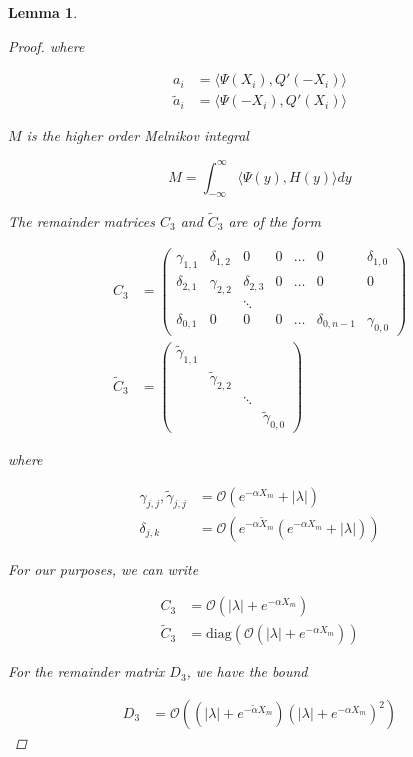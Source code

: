 \documentclass[12pt]{article}
\newtheorem{lemma}{Lemma}
\begin{document}
\begin{lemma}
\begin{proof}
where

\begin{align*}
a_i &= \langle \Psi(X_i), Q'(-X_i) \rangle \\
\tilde{a}_i &= \langle \Psi(-X_i), Q'(X_i) \rangle
\end{align*}

$M$ is the higher order Melnikov integral

\[
M = \int_{-\infty}^\infty \langle \Psi(y), H(y) \rangle dy
\]

The remainder matrices $C_3$ and $\tilde{C}_3$ are of the form

\begin{align*}
C_3 &= \begin{pmatrix}
\gamma_{1,1} & \delta_{1,2} & 0 & 0 & \dots & 0 & \delta_{1,0} \\
\delta_{2,1} & \gamma_{2,2} & \delta_{2,3} & 0 & \dots & 0 & 0 \\
&  & \ddots \\
\delta_{0,1} & 0 & 0 & 0 & \dots & \delta_{0, n-1} & \gamma_{0,0}
\end{pmatrix} \\
\tilde{C}_3 &= \begin{pmatrix}
\tilde{\gamma}_{1,1} \\
& \tilde{\gamma}_{2,2} \\
&&\ddots \\
&&& \tilde{\gamma}_{0,0}
\end{pmatrix}
\end{align*}

where

\begin{align*}
\gamma_{j,j}, \tilde{\gamma}_{j,j} &= \mathcal{O}(e^{-\alpha X_m} + |\lambda|) \\
\delta_{j,k} &= \mathcal{O}(e^{-\tilde{\alpha X_m}}(e^{-\alpha X_m} + |\lambda|))
\end{align*}

For our purposes, we can write

\begin{align*}
C_3 &= \mathcal{O}(|\lambda| + e^{-\alpha X_m}) \\
\tilde{C}_3 &= \text{diag}(\mathcal{O}(|\lambda| + e^{-\alpha X_m}))
\end{align*}

For the remainder matrix $D_3$, we have the bound

\begin{align*}
D_3 &= \mathcal{O}((|\lambda| + e^{-\tilde{\alpha} X_m})(|\lambda| + e^{-\alpha X_m})^2)
\end{align*}

\end{proof}
\end{lemma}
\end{document}

